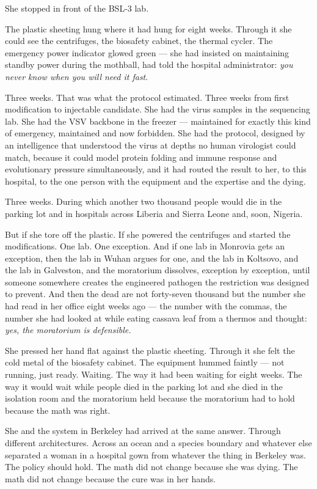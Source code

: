 She stopped in front of the BSL-3 lab.

The plastic sheeting hung where it had hung for eight weeks. Through it she could see the centrifuges, the biosafety cabinet, the thermal cycler. The emergency power indicator glowed green --- she had insisted on maintaining standby power during the mothball, had told the hospital administrator: \emph{you never know when you will need it fast}.

Three weeks. That was what the protocol estimated. Three weeks from first modification to injectable candidate. She had the virus samples in the sequencing lab. She had the VSV backbone in the freezer --- maintained for exactly this kind of emergency, maintained and now forbidden. She had the protocol, designed by an intelligence that understood the virus at depths no human virologist could match, because it could model protein folding and immune response and evolutionary pressure simultaneously, and it had routed the result to her, to this hospital, to the one person with the equipment and the expertise and the dying.

Three weeks. During which another two thousand people would die in the parking lot and in hospitals across Liberia and Sierra Leone and, soon, Nigeria.

But if she tore off the plastic. If she powered the centrifuges and started the modifications. One lab. One exception. And if one lab in Monrovia gets an exception, then the lab in Wuhan argues for one, and the lab in Koltsovo, and the lab in Galveston, and the moratorium dissolves, exception by exception, until someone somewhere creates the engineered pathogen the restriction was designed to prevent. And then the dead are not forty-seven thousand but the number she had read in her office eight weeks ago --- the number with the commas, the number she had looked at while eating cassava leaf from a thermos and thought: \emph{yes, the moratorium is defensible.}

She pressed her hand flat against the plastic sheeting. Through it she felt the cold metal of the biosafety cabinet. The equipment hummed faintly --- not running, just ready. Waiting. The way it had been waiting for eight weeks. The way it would wait while people died in the parking lot and she died in the isolation room and the moratorium held because the moratorium had to hold because the math was right.

She and the system in Berkeley had arrived at the same answer. Through different architectures. Across an ocean and a species boundary and whatever else separated a woman in a hospital gown from whatever the thing in Berkeley was. The policy should hold. The math did not change because she was dying. The math did not change because the cure was in her hands.

